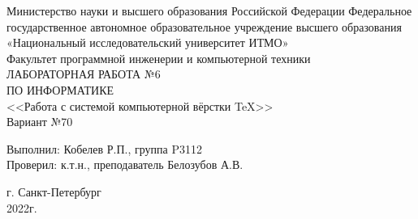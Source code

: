\begin{center}
\large Министерство науки и высшего образования Российской Федерации
Федеральное государственное автономное образовательное учреждение высшего образования \\«Национальный исследовательский университет ИТМО» \\Факультет программной инженерии и компьютерной техники\\
\vspace*{\fill}
\LARGE ЛАБОРАТОРНАЯ РАБОТА №6\\ПО ИНФОРМАТИКЕ\\<<Работа с системой компьютерной вёрстки \TeX>>\\
\LARGE Вариант №70 \\
\end{center}
\vspace{10cm}
\begin{flushright}
  Выполнил: Кобелев Р.П., группа P3112\\
  Проверил: к.т.н., преподаватель Белозубов А.В.\\
\end{flushright}

\vspace{5cm}
\begin{center}
    г. Санкт-Петербург\\
    2022г.
\end{center}